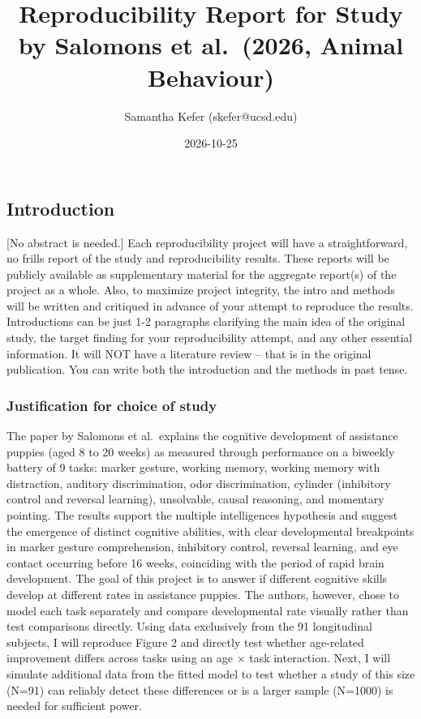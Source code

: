\documentclass[
  letterpaper,
  DIV=11,
  numbers=noendperiod]{scrartcl}
\title{Reproducibility Report for Study by Salomons et al.~(2026, Animal
Behaviour)}
\author{Samantha Kefer (skefer@ucsd.edu)}
\date{2026-10-25}
\renewcommand*\contentsname{Table of contents}
\newcommand\contentsname{Table of contents}
\begin{document}
\maketitle

\renewcommand*\contentsname{Table of contents}
{
\setcounter{tocdepth}{3}
\tableofcontents
}

\subsection{Introduction}\label{introduction}

{[}No abstract is needed.{]} Each reproducibility project will have a
straightforward, no frills report of the study and reproducibility
results. These reports will be publicly available as supplementary
material for the aggregate report(s) of the project as a whole. Also, to
maximize project integrity, the intro and methods will be written and
critiqued in advance of your attempt to reproduce the results.
Introductions can be just 1-2 paragraphs clarifying the main idea of the
original study, the target finding for your reproducibility attempt, and
any other essential information. It will NOT have a literature review --
that is in the original publication. You can write both the introduction
and the methods in past tense.

\subsubsection{Justification for choice of
study}\label{justification-for-choice-of-study}

The paper by Salomons et al.~explains the cognitive development of
assistance puppies (aged 8 to 20 weeks) as measured through performance
on a biweekly battery of 9 tasks: marker gesture, working memory,
working memory with distraction, auditory discrimination, odor
discrimination, cylinder (inhibitory control and reversal learning),
unsolvable, causal reasoning, and momentary pointing. The results
support the multiple intelligences hypothesis and suggest the emergence
of distinct cognitive abilities, with clear developmental breakpoints in
marker gesture comprehension, inhibitory control, reversal learning, and
eye contact occurring before 16 weeks, coinciding with the period of
rapid brain development. The goal of this project is to answer if
different cognitive skills develop at different rates in assistance
puppies. The authors, however, chose to model each task separately and
compare developmental rate visually rather than test comparisons
directly. Using data exclusively from the 91 longitudinal subjects, I
will reproduce Figure 2 and directly test whether age-related
improvement differs across tasks using an age × task interaction. Next,
I will simulate additional data from the fitted model to test whether a
study of this size (N=91) can reliably detect these differences or is a
larger sample (N=1000) is needed for sufficient power.
\end{document}
